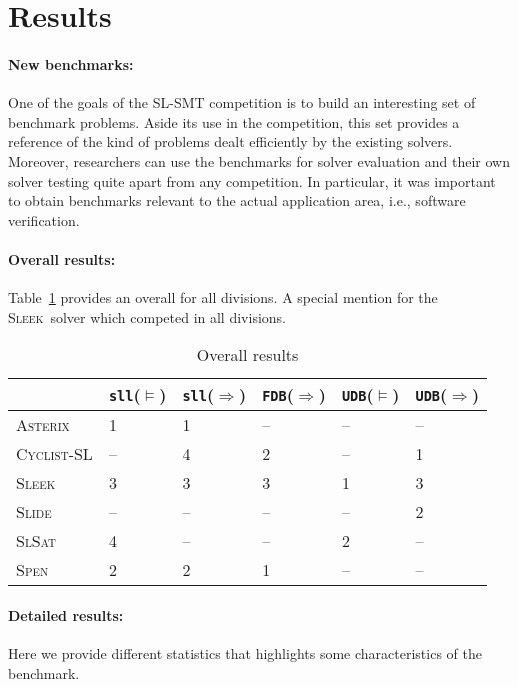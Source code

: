 \documentclass{llncs}
\newcommand{\limp}{\Rightarrow}
\newcommand{\sllsat}{\texttt{sll}($\models$)}
\newcommand{\sllent}{\texttt{sll}($\limp$)}
\newcommand{\FDBent}{\texttt{FDB}($\limp$)}
\newcommand{\UDBsat}{\texttt{UDB}($\models$)}
\newcommand{\UDBent}{\texttt{UDB}($\limp$)}
\newcommand{\ASTERIX}{\textsc{Asterix}}
\newcommand{\CYCLIST}{\textsc{Cyclist-SL}}
\newcommand{\SLEEK}{\textsc{Sleek}}
\newcommand{\SLIDE}{\textsc{Slide}}
\newcommand{\SLSAT}{\textsc{SlSat}}
\newcommand{\SPEN}{\textsc{Spen}}
\begin{document}
\section{Results}

\paragraph{New benchmarks:}
One of the goals of the SL-SMT competition is to build an interesting set of benchmark problems. 
Aside its use in the competition, this set provides a reference of the kind of problems dealt efficiently by the existing solvers.
Moreover, researchers can use the benchmarks for solver evaluation and their own solver testing quite apart from any competition. 
In particular, it was important to obtain benchmarks relevant to the actual application area, i.e., software verification.


\paragraph{Overall results:}
Table~\ref{tab:overall} provides an overall for all divisions.
A special mention for the \SLEEK\ solver which competed in all divisions.


\begin{table}
\begin{center}
\begin{tabular}{p{2cm}p{2cm}p{2cm}p{2cm}p{2cm}p{1cm}}\hline
& \sllsat & \sllent & \FDBent
& \UDBsat & \UDBent \\\hline
\ASTERIX &
1 &
1 &
-- &
-- &
--
\\\hline
\CYCLIST &
-- &
4 &
2 &
-- &
1 
\\\hline
\SLEEK &
3 &
3 &
3 &
1 &
3
\\\hline
\SLIDE &
-- &
-- &
-- &
-- &
2
\\\hline
\SLSAT &
4  &
--  &
--  &
2  &
--
\\\hline
\SPEN &
2 &
2 &
1 &
-- &
--
\\\hline
\end{tabular}
\end{center}
\caption{Overall results}
\label{tab:overall}
\end{table}


\paragraph{Detailed results:}
Here we provide different statistics that highlights some characteristics of the benchmark. 
\end{document}
